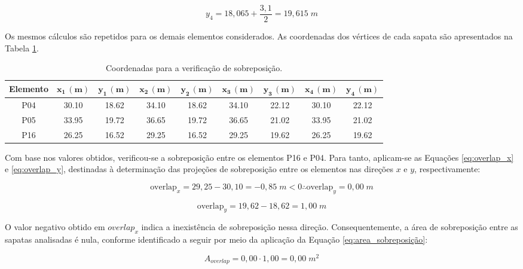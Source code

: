 \begin{equation}
y_{4}= 18,065 + \frac{3,1}{2} = 19,615 \; m
    \label{eq:EL16_coord_y4}
\end{equation}

Os mesmos cálculos são repetidos para os demais elementos considerados. As coordenadas dos vértices de cada sapata são apresentados na Tabela \ref{tab:sobreposicao_s16}.

\begin{table}[H]
\caption{Coordenadas para a verificação de sobreposição.}
\label{tab:sobreposicao_s16}
\centering
\begin{tabular}{ccccccccc}
\toprule
\textbf{Elemento} &
$\mathbf{x_1\,(m)}$ & $\mathbf{y_1\,(m)}$ &
$\mathbf{x_2\,(m)}$ & $\mathbf{y_2\,(m)}$ &
$\mathbf{x_3\,(m)}$ & $\mathbf{y_3\,(m)}$ &
$\mathbf{x_4\,(m)}$ & $\mathbf{y_4\,(m)}$  \\
\midrule
P04 & 30.10 & 18.62 & 34.10 & 18.62 & 34.10 & 22.12 & 30.10 & 22.12 \\
P05 & 33.95 & 19.72 & 36.65 & 19.72 & 36.65 & 21.02 & 33.95 & 21.02  \\
P16 & 26.25 & 16.52 & 29.25 & 16.52 & 29.25 & 19.62 & 26.25 & 19.62  \\
\bottomrule
\end{tabular}
\end{table}

Com base nos valores obtidos, verificou-se a sobreposição entre os elementos P16 e P04. Para tanto, aplicam-se as Equações \eqref{eq:overlap_x} e \eqref{eq:overlap_y}, destinadas à determinação das projeções de sobreposição entre os elementos nas direções $x$ e $y$, respectivamente:

\begin{equation}
\text{overlap}_x =  29,25 - 30,10 = -0,85 \; m < 0 \therefore \text{overlap}_y = 0,00 \; m
\label{eq:EL16_overlp_x}
\end{equation}

\begin{equation}
\text{overlap}_y = 19,62 - 18,62 = 1,00 \; m
\label{eq:EL16_overlap_y}
\end{equation}

O valor negativo obtido em $overlap_x$ indica a inexistência de sobreposição nessa direção. Consequentemente, a área de sobreposição entre as sapatas analisadas é nula, conforme identificado a seguir por meio da aplicação  da Equação \eqref{eq:area_sobreposição}:

\begin{equation}
    A_{overlap} = 0,00 \cdot 1,00 = 0,00 \; m^2
    \label{eq:EL16_area_sobreposição}
\end{equation}

